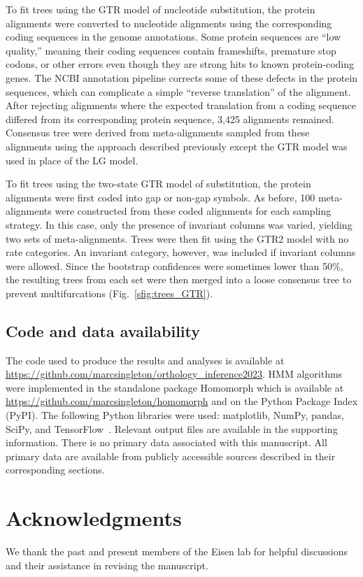 \documentclass[10pt,letterpaper]{article}
\begin{document}
To fit trees using the GTR model of nucleotide substitution, the protein alignments were converted to nucleotide alignments using the corresponding coding sequences in the genome annotations. Some protein sequences are “low quality,” meaning their coding sequences contain frameshifts, premature stop codons, or other errors even though they are strong hits to known protein-coding genes. The NCBI annotation pipeline corrects some of these defects in the protein sequences, which can complicate a simple “reverse translation” of the alignment. After rejecting alignments where the expected translation from a coding sequence differed from its corresponding protein sequence, 3,425 alignments remained. Consensus tree were derived from meta-alignments sampled from these alignments using the approach described previously except the GTR model was used in place of the LG model.

To fit trees using the two-state GTR model of substitution, the protein alignments were first coded into gap or non-gap symbols. As before, 100 meta-alignments were constructed from these coded alignments for each sampling strategy. In this case, only the presence of invariant columns was varied, yielding two sets of meta-alignments. Trees were then fit using the GTR2 model with no rate categories. An invariant category, however, was included if invariant columns were allowed. Since the bootstrap confidences were sometimes lower than 50\%, the resulting trees from each set were then merged into a loose consensus tree to prevent multifurcations (Fig.~\ref{sfig:trees_GTR}).

\subsection*{Code and data availability}
The code used to produce the results and analyses is available at \url{https://github.com/marcsingleton/orthology_inference2023}. HMM algorithms were implemented in the standalone package Homomorph which is available at \url{https://github.com/marcsingleton/homomorph} and on the Python Package Index (PyPI). The following Python libraries were used: matplotlib, NumPy, pandas, SciPy, and TensorFlow~\cite{Hunter2007, Harris2020, McKinney2010, Virtanen2020, Abadi2015}. Relevant output files are available in the supporting information. There is no primary data associated with this manuscript. All primary data are available from publicly accessible sources described in their corresponding sections.

\section*{Acknowledgments}
We thank the past and present members of the Eisen lab for helpful discussions and their assistance in revising the manuscript.
\end{document}
